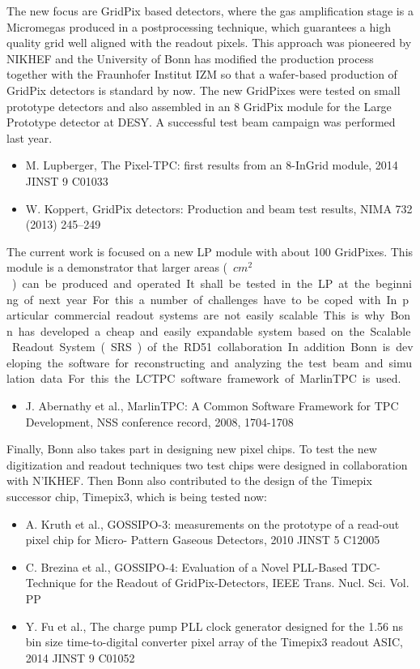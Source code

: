 The new focus are GridPix based detectors, where the gas amplification stage is a Micromegas produced in a postprocessing technique, which guarantees a high quality grid well aligned with the readout pixels. This approach was pioneered by NIKHEF and the University of Bonn has modified the production process together with the Fraunhofer Institut IZM so that a wafer-based production of GridPix detectors is standard by now. The new GridPixes were tested on small prototype detectors and also assembled in an 8 GridPix module for the Large Prototype detector at DESY. A successful test beam campaign was performed last year.
\begin{itemize}
\item M. Lupberger, The Pixel-TPC: first results from an 8-InGrid module, 2014 JINST 9 C01033
\item W. Koppert, GridPix detectors: Production and beam test results, NIMA 732 (2013) 245–249 
\end{itemize}
The current work is focused on a new LP module with about 100 GridPixes. This module is a demonstrator that larger areas (~\unit[400]{$cm^2$}) can be produced and operated. It shall be tested in the LP at the beginning of next year. For this a number of challenges have to be coped with. In particular commercial readout systems are not easily scalable. This is why Bonn has developed a cheap and easily expandable system based on the Scalable Readout System (SRS) of the RD51 collaboration.
In addition Bonn is developing the software for reconstructing and analyzing the test beam and simulation data. For this the LCTPC software framework of MarlinTPC is used.
\begin{itemize}
\item J. Abernathy et al., MarlinTPC: A Common Software Framework for TPC Development, NSS conference record, 2008, 1704-1708
\end{itemize}
Finally, Bonn also takes part in designing new pixel chips. To test the new digitization and readout techniques two test chips were designed in collaboration with N'IKHEF. Then Bonn also contributed to the design of the Timepix successor chip, Timepix3, which is being tested now:
\begin{itemize}
\item A. Kruth et al., GOSSIPO-3: measurements on the prototype of a read-out pixel chip for Micro- Pattern Gaseous Detectors, 2010 JINST 5 C12005
\item C. Brezina et al., GOSSIPO-4: Evaluation of a Novel PLL-Based TDC-Technique for the Readout of GridPix-Detectors, IEEE Trans. Nucl. Sci. Vol. PP
\item Y. Fu et al., The charge pump PLL clock generator designed for the 1.56 ns bin size time-to-digital converter pixel array of the Timepix3 readout ASIC, 2014 JINST 9 C01052
\end{itemize}

